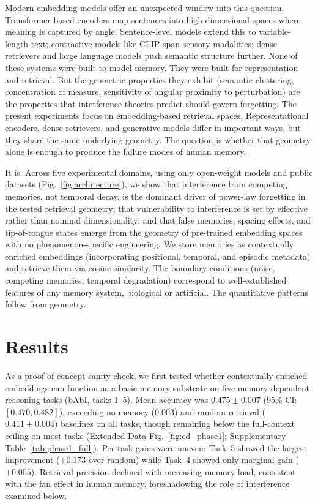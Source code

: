 \documentclass[11pt]{article}
\begin{document}
Modern embedding models offer an unexpected window into this question. Transformer-based encoders\cite{vaswani2017} map sentences into high-dimensional spaces where meaning is captured by angle. Sentence-level models\cite{reimers2019} extend this to variable-length text; contrastive models like CLIP\cite{radford2021} span sensory modalities; dense retrievers\cite{xiao2023} and large language models\cite{qwen2024} push semantic structure further. None of these systems were built to model memory. They were built for representation and retrieval. But the geometric properties they exhibit (semantic clustering, concentration of measure, sensitivity of angular proximity to perturbation) are the properties that interference theories predict should govern forgetting. The present experiments focus on embedding-based retrieval spaces. Representational encoders, dense retrievers, and generative models differ in important ways, but they share the same underlying geometry. The question is whether that geometry alone is enough to produce the failure modes of human memory.

It is. Across five experimental domains, using only open-weight models and public datasets (Fig.~\ref{fig:architecture}), we show that interference from competing memories, not temporal decay, is the dominant driver of power-law forgetting in the tested retrieval geometry; that vulnerability to interference is set by effective rather than nominal dimensionality; and that false memories, spacing effects, and tip-of-tongue states emerge from the geometry of pre-trained embedding spaces with no phenomenon-specific engineering. We store memories as contextually enriched embeddings (incorporating positional, temporal, and episodic metadata) and retrieve them via cosine similarity. The boundary conditions (noise, competing memories, temporal degradation) correspond to well-established features of any memory system, biological or artificial. The quantitative patterns follow from geometry.

\section*{Results}

As a proof-of-concept sanity check, we first tested whether contextually enriched embeddings can function as a basic memory substrate on five memory-dependent reasoning tasks (bAbI, tasks 1--5). Mean accuracy was $0.475 \pm 0.007$ (95\% CI: $[0.470, 0.482]$), exceeding no-memory ($0.003$) and random retrieval ($0.411 \pm 0.004$) baselines on all tasks, though remaining below the full-context ceiling on most tasks (Extended Data Fig.~\ref{fig:ed_phase1}; Supplementary Table~\ref{tab:phase1_full}). Per-task gains were uneven: Task~5 showed the largest improvement ($+0.173$ over random) while Task~4 showed only marginal gain ($+0.005$). Retrieval precision declined with increasing memory load, consistent with the fan effect in human memory\cite{murdock1962}, foreshadowing the role of interference examined below.
\end{document}
